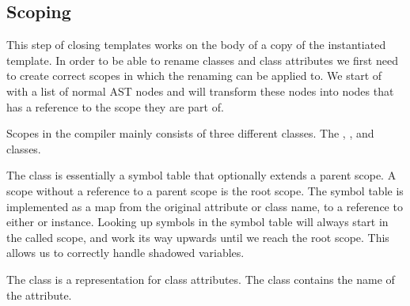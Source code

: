 %
%

\subsection{Scoping}\label{subsec:inst-scoping}

This step of closing templates works on the body of a copy of the instantiated template.
In order to be able to rename classes and class attributes we first need to create correct scopes in which the renaming can be applied to.
We start of with a list of normal AST nodes and will transform these nodes into nodes that has a reference to the scope they are part of.

Scopes in the compiler mainly consists of three different classes.
The , , and  classes.

The  class is essentially a symbol table that optionally extends a parent scope.
A scope without a reference to a parent scope is the root scope.
The symbol table is implemented as a map from the original attribute or class name, to a reference to either  or  instance.
Looking up symbols in the symbol table will always start in the called scope, and work its way upwards until we reach the root scope.
This allows us to correctly handle shadowed variables.

The  class is a representation for class attributes.
The class contains the name of the attribute.


